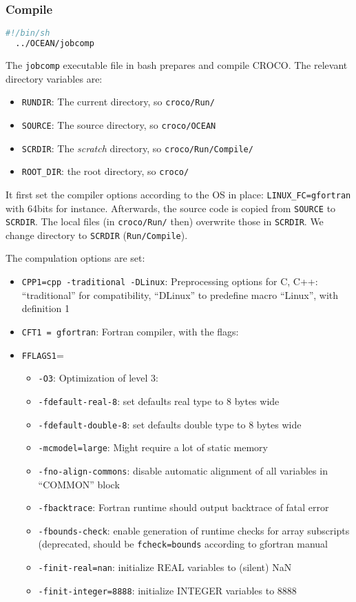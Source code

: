 \documentclass{article}
\begin{document}
\subsubsection{Compile}
\begin{lstlisting}[language=bash]
  #!/bin/sh
  ../OCEAN/jobcomp
\end{lstlisting}
The \texttt{jobcomp} executable file in bash prepares and compile CROCO.
The relevant directory variables are:
\begin{itemize}
\item \texttt{RUNDIR}: The current directory, so \texttt{croco/Run/}
\item \texttt{SOURCE}: The source directory, so \texttt{croco/OCEAN}
\item \texttt{SCRDIR}: The \emph{scratch} directory, so \texttt{croco/Run/Compile/}
\item \texttt{ROOT\_DIR}: the root directory, so \texttt{croco/}
\end{itemize}
It first set the compiler options according to the OS in place: \texttt{LINUX\_FC=gfortran} with 64bits for instance.
Afterwards, the source code is copied from \texttt{SOURCE} to \texttt{SCRDIR}.
The local files (in \texttt{croco/Run/} then) overwrite those in \texttt{SCRDIR}.
We change directory to \texttt{SCRDIR} (\texttt{Run/Compile}).

The compulation options are set:
\begin{itemize}
\item \texttt{CPP1=cpp -traditional -DLinux}: Preprocessing options for C, C++: ``traditional'' for compatibility, ``DLinux'' to predefine macro ``Linux'', with definition 1
\item \texttt{CFT1 = gfortran}: Fortran compiler, with the flags:
\item \texttt{FFLAGS1}=
  \begin{itemize}
  \item \texttt{-O3}: Optimization of level 3:
  \item \texttt{-fdefault-real-8}: set defaults real type to 8 bytes wide
  \item \texttt{-fdefault-double-8}: set defaults double type to 8 bytes wide
  \item \texttt{-mcmodel=large}: Might require a lot of static memory
  \item \texttt{-fno-align-commons}: disable automatic alignment of all variables in ``COMMON'' block
  \item \texttt{-fbacktrace}: Fortran runtime should output backtrace of fatal error
  \item \texttt{-fbounds-check}: enable generation of runtime checks for array subscripts (deprecated, should be \texttt{fcheck=bounds} according to gfortran manual
  \item \texttt{-finit-real=nan}: initialize REAL variables to (silent) NaN
  \item \texttt{-finit-integer=8888}: initialize INTEGER variables to $8888$
  \end{itemize}
\end{itemize}
\end{document}
